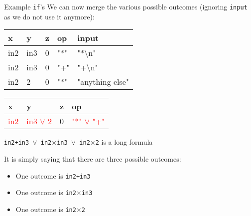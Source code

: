 \documentclass{beamer}
\newcommand{\red}[1]{
\textcolor{red}{#1}
}
\newcommand{\ts}{\textbackslash}
\begin{document}
\begin{frame}[fragile]{Example \texttt{if}'s}
We can now merge the various possible outcomes (ignoring \texttt{input} as we do not use it anymore):

\begin{tabular}{| l | l | l | l | l |}
\hline
x & y & z & op & input \\
\hline
in2 & in3 & 0 & "*" & "*\ts n" \\
\hline
in2 & in3 & 0 & "+" & "+\ts n" \\
\hline
in2 & 2 & 0 & "*" & "anything else" \\
\hline
\end{tabular}

\pause

\begin{tabular}{| l | l | l | l |}
\hline
x & y & z & op \\
\hline
\red{in2} & \red{in3 $\vee$ 2} & 0 & \red{"*" $\vee$ "+"} \\
\hline
\end{tabular}
\end{frame}


\begin{slide}{
\item \texttt{in2+in3 $\vee$ in2$\times$in3 $\vee$ in2$\times$2} is a long formula
\item It is simply saying that there are three possible outcomes:
\begin{itemize}
\item One outcome is \texttt{in2+in3}
\item One outcome is \texttt{in2$\times$in3}
\item One outcome is \texttt{in2$\times$2}
\end{itemize}
}\end{slide}
\end{document}
